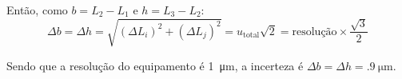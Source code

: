 Então, como $b = L_2 - L_1$ e $h = L_3 - L_2$:
\begin{equation*}
    \Delta b = \Delta h = \sqrt{(\Delta L_i)^2 + (\Delta L_j)^2} = u_\text{total} \sqrt{2} = \text{resolução} \times \frac{\sqrt{3}}{2}
\end{equation*}

Sendo que a resolução do equipamento é \SI{1}{\micro\meter}, a incerteza é $\Delta b = \Delta h = \SI{.9}{\micro\meter}$.
